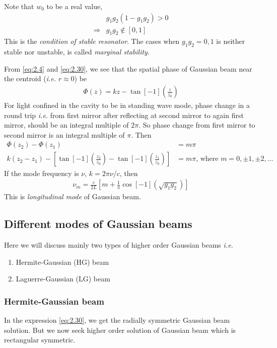 \documentclass[11pt,a4paper]{article}
\numberwithin{equation}{section}
\begin{document}
Note that $w_0$ to be a real value,
\begin{align}
	& g_1g_2(1-g_1g_2)>0\nonumber\\
	\Rightarrow& \boxed{g_1g_2 \notin [0,1]}
\end{align} This is the \textit{condition of stable resonator}. The cases when $g_1g_2= 0,1$ is neither stable nor unstable, is called \textit{marginal stability}.

From \ref{eq:2.4} and \ref{eq:2.30}, we see that the spatial phase of Gaussian beam near the centroid (\textit{i.e.} $r\approx0$) be
\begin{align}
	\Phi(z) = kz-\tan[-1](\frac{z}{z_0})
\end{align}
For light confined in the cavity to be in standing wave mode, phase change in a round trip \textit{i.e.} from first mirror after reflecting at second mirror to again first mirror, should be an integral multiple of $2\pi$. So phase change from first mirror to second mirror is an integral multiple of $\pi$. Then
\begin{align}
	\Phi(z_2)-\Phi(z_1) &= m\pi\nonumber\\
	k(z_2-z_1)- \left[\tan[-1](\frac{z_2}{z_0})-\tan[-1](\frac{z_1}{z_0})\right]&=m\pi \text{, where } m= 0, \pm1,\pm2 ,\dots
\end{align} 
If the mode frequency is $\nu$, $k=2\pi\nu/c$, then
\begin{align}
	\nu_m = \frac{c}{2L}\left[m+\frac{1}{\pi}\cos[-1](\sqrt{g_1g_2})\right]
\end{align} This is \textit{longitudinal mode} of Gaussian beam.

\subsection{Different modes of Gaussian beams}
Here we will discuss mainly two types of higher order Gaussian beams \textit{i.e.}
\begin{enumerate}
	\item Hermite-Gaussian (HG) beam
	\item Laguerre-Gaussian (LG) beam
\end{enumerate}

\subsubsection{Hermite-Gaussian beam}
In the expression \ref{eq:2.30}, we get the radially symmetric Gaussian beam solution. But we now seek higher order solution of Gaussian beam which is rectangular symmetric.
\end{document}
